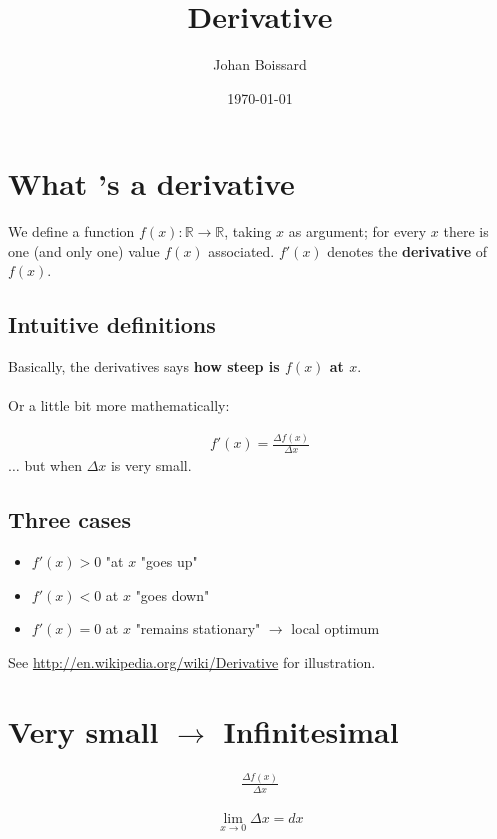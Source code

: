 \documentclass[a4paper] {scrartcl}%
\author{Johan Boissard}
\date{\today}
\title{Derivative}
\begin{document}
\maketitle

\section{What 's a derivative}

We define a function $f(x): \mathbb R \rightarrow\mathbb R$, taking $x$ as argument; for every $x$ there is one (and only one) value $f(x)$ associated. $f'(x)$ denotes the \textbf{derivative} of $f(x)$.

\subsection{Intuitive definitions}
Basically, the derivatives says \textbf{how steep is $f(x)$ at $x$}. 
\\\\Or a little bit more mathematically:



\begin{eqnarray}
	f'(x)=\frac{\Delta f(x)}{\Delta x}
\end{eqnarray}
$\dots$ but when $\Delta x$ is very small.

\subsection{Three cases}
\begin{itemize}
	\item $f'(x)>0$ "at $x$ "goes up"
	\item $f'(x)<0$ at $x$ "goes down"
	\item $f'(x)=0$ at $x$ "remains stationary" $\rightarrow$ local optimum
\end{itemize}

See \url{http://en.wikipedia.org/wiki/Derivative} for illustration.

\section{Very small $\rightarrow$ Infinitesimal}
\begin{eqnarray}
	\frac{\Delta f(x)}{\Delta x}
\end{eqnarray}

\begin{eqnarray}
	\lim_{x\rightarrow0}\Delta x=dx
\end{eqnarray}
\end{document}
